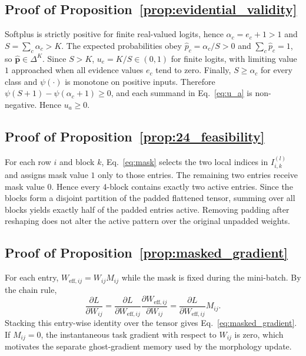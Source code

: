 \documentclass[letterpaper]{article} %
\begin{document}
\subsection{Proof of Proposition~\ref{prop:evidential_validity}}
Softplus is strictly positive for finite real-valued logits, hence $\alpha_c=e_c+1>1$ and $S=\sum_c\alpha_c>K$. The expected probabilities obey $\hat{p}_c=\alpha_c/S>0$ and $\sum_c\hat{p}_c=1$, so $\hat{\bm{p}}\in\Delta^K$. Since $S>K$, $u_e=K/S\in(0,1)$ for finite logits, with limiting value $1$ approached when all evidence values $e_c$ tend to zero. Finally, $S\ge\alpha_c$ for every class and $\psi(\cdot)$ is monotone on positive inputs. Therefore $\psi(S+1)-\psi(\alpha_c+1)\ge0$, and each summand in Eq.~\ref{eq:u_a} is non-negative. Hence $u_a\ge0$.

\subsection{Proof of Proposition~\ref{prop:24_feasibility}}
For each row $i$ and block $k$, Eq.~\ref{eq:mask} selects the two local indices in $I_{i,k}^{(l)}$ and assigns mask value $1$ only to those entries. The remaining two entries receive mask value $0$. Hence every 4-block contains exactly two active entries. Since the blocks form a disjoint partition of the padded flattened tensor, summing over all blocks yields exactly half of the padded entries active. Removing padding after reshaping does not alter the active pattern over the original unpadded weights.

\subsection{Proof of Proposition~\ref{prop:masked_gradient}}
For each entry, $W_{\text{eff},ij}=W_{ij}M_{ij}$ while the mask is fixed during the mini-batch. By the chain rule,
\begin{equation}
    \frac{\partial L}{\partial W_{ij}}
    =
    \frac{\partial L}{\partial W_{\text{eff},ij}}
    \frac{\partial W_{\text{eff},ij}}{\partial W_{ij}}
    =
    \frac{\partial L}{\partial W_{\text{eff},ij}}M_{ij}.
\end{equation}
Stacking this entry-wise identity over the tensor gives Eq.~\ref{eq:masked_gradient}. If $M_{ij}=0$, the instantaneous task gradient with respect to $W_{ij}$ is zero, which motivates the separate ghost-gradient memory used by the morphology update.
\end{document}
